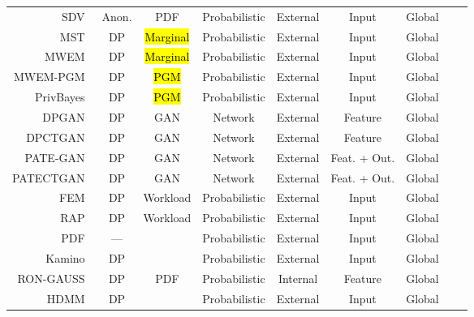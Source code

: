 \documentclass[parskip=full]{scrartcl}
\begin{document}
\begin{longtable}{rcccccccc}
    \bottomrule
    \endlastfoot
    SDV~\cite{patki2016synthetic} & Anon. & PDF & Probabilistic & External & Input & Global \\
    MST~\cite{mckenna2021winning} & DP & \hl{Marginal} & Probabilistic & External & Input & Global \\
    MWEM~\cite{hardt2012simple} & DP & \hl{Marginal} & Probabilistic & External & Input & Global \\
    MWEM-PGM~\cite{mckenna2019graphical} & DP & \hl{PGM} & Probabilistic & External & Input & Global \\
    PrivBayes~\cite{zhang2017privbayes} & DP & \hl{PGM} & Probabilistic & External & Input & Global \\
    DPGAN~\cite{xie2018differentially} & DP & GAN & Network & External & Feature & Global \\
    DPCTGAN~\cite{rosenblatt2020differentially} & DP & GAN &  Network & External & Feature & Global \\
    PATE-GAN~\cite{jordon2018pate} & DP & GAN & Network & External & Feat. + Out. & Global \\
    PATECTGAN~\cite{rosenblatt2020differentially} & DP & GAN & Network & External & Feat. + Out. & Global \\
    FEM~\cite{vietri2020new} & DP & Workload & Probabilistic & External & Input & Global \\
    RAP~\cite{aydore2021differentially} & DP & Workload & Probabilistic & External & Input & Global \\
    PDF~\cite{de2019formal, suciu2011probabilistic} & --- &  & Probabilistic & External & Input & Global \\
    Kamino~\cite{ge2021kamino} & DP  &  & Probabilistic & External & Input & Global \\
    RON-GAUSS~\cite{chanyaswad2019ron} & DP & PDF & Probabilistic & Internal & Feature & Global \\
    HDMM~\cite{mckenna2018optimizing} & DP &  & Probabilistic & External & Input & Global \\

\end{longtable}
\end{document}
